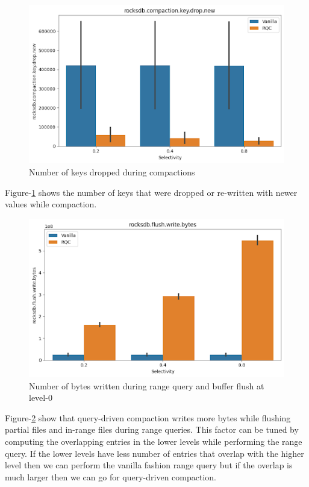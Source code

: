 \begin{figure}
    \includegraphics[scale=0.45]{Figures/Keys Drop In Compactions.png}
    \caption{Number of keys dropped during compactions}\label{fig:keys_drop_in_compactions}
\end{figure}

Figure-\ref{fig:keys_drop_in_compactions} shows the number of keys that were dropped or re-written with newer values 
while compaction.

\begin{figure}
    \includegraphics[scale=0.45]{Figures/Range Query Flush Write Bytes.png}
    \caption{Number of bytes written during range query and buffer flush at 
    level-0}\label{fig:range_query_flush_write_bytes}
\end{figure}

Figure-\ref{fig:range_query_flush_write_bytes} show that query-driven compaction writes more bytes while flushing
partial files and in-range files during range queries. This factor can be tuned by computing the overlapping entries in 
the lower levels while performing the range query. If the lower levels have less number of entries that overlap with the 
higher level then we can perform the vanilla fashion range query but if the overlap is much larger then we can go for 
query-driven compaction.